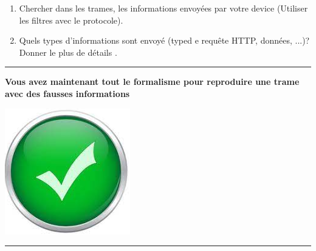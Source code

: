 \documentclass[french, 12pt]{article}%
\newcommand{\itemE}{\item[$\bullet$]}
\newif\ifPROF
\begin{document}
\begin{enumerate}[resume]
\item Chercher dans les trames, les informations envoyées par votre device (Utiliser les filtres avec le protocole).
\itemE Quels types d'informations sont envoyé (typed e requête HTTP, données, ...)? Donner le plus de détails .
\end{enumerate}

\ifPROF
\color{red}
\footnotesize
\begin{lstlisting}[style=commande]

Frame 127: 92 bytes on wire (736 bits), 92 bytes captured (736 bits) on interface \Device\NPF_{C961D6CB-060E-4263-A69C-163F2B2E6FBE}, id 0
Ethernet II, Src: Espressif_fc:b1:dc (c8:c9:a3:fc:b1:dc), Dst: HonHaiPrecis_6f:8f:df (4c:0f:6e:6f:8f:df)
Internet Protocol Version 4, Src: 192.168.1.71, Dst: 192.168.1.19
Transmission Control Protocol, Src Port: 49585, Dst Port: 80, Seq: 200, Ack: 1, Len: 38
[2 Reassembled TCP Segments (237 bytes): #125(199), #127(38)]
Hypertext Transfer Protocol
JavaScript Object Notation: application/json
    Object
        Member: id
            [Path with value: /id:ESP32-001]
            [Member with value: id:ESP32-001]
            String value: ESP32-001
            Key: id
            [Path: /id]
        Member: temperature
            [Path with value: /temperature:53.33]
            [Member with value: temperature:53.33]
            Number value: 53.33
            Key: temperature
            [Path: /temperature]
\end{lstlisting}
\normalsize
\normalcolor
\else

\fi




\vspace{0.5cm}
\begin{center}
 \rule{0.75\linewidth}{1pt}
\end{center}
\begin{minipage}[c]{0.59\linewidth}

\textbf{Vous avez maintenant tout le formalisme pour reproduire une trame avec des fausses informations}
\end{minipage}
\begin{minipage}[c]{0.4\linewidth}
\begin{center}
\includegraphics[scale=0.1]{./ressource/OKLogo}
\end{center}
\end{minipage}
\begin{center}
 \rule{0.75\linewidth}{1pt}
\end{center}
\end{document}
